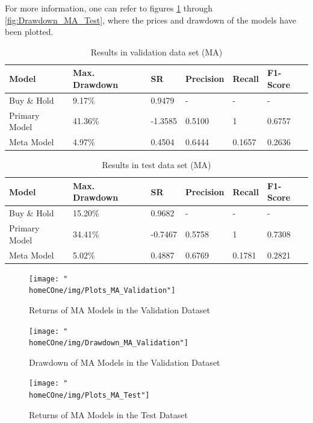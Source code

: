 \documentclass[a4paper]{article}
\newcommand{\homeCOne}{../../Chapter 1 - Metalabeling/Draft}
\begin{document}
For more information, one can refer to figures 
\ref{fig:Plots_MA_Validation} through \ref{fig:Drawdown_MA_Test}, 
where the prices and drawdown of the models have been plotted.

\begin{table}[htbp]
\caption{Results in validation data set (MA)}
\label{tab:ResultsCV}
\centering
\begin{tabular}{ |C{3cm}|C{3cm}|C{2cm}|C{2cm}|C{2cm}|C{2cm}|}
	\hline
	Model 			& Max. Drawdown	& SR			& Precision & Recall 
	& F1-Score\\
	\hline
	Buy \& Hold		&  9.17\% 		&  0.9479	& -		 & - 
	& -\\  
	Primary Model 	& 41.36\% 		& -1.3585	& 0.5100 & 1 
	& 0.6757\\ 
	Meta Model 		&  4.97\% 		&  0.4504	& 0.6444 & 0.1657
	& 0.2636\\ 
	\hline
\end{tabular}
\end{table}

\begin{table}[htbp]
\caption{Results in test data set (MA)}
\label{tab:ResultsTst}
\centering
\begin{tabular}{ |C{3cm}|C{3cm}|C{2cm}|C{2cm}|C{2cm}|C{2cm}|}
	\hline
	Model 			& Max. Drawdown & SR			& Precision & Recall
	& F1-Score\\
	\hline
	Buy \& Hold		& 15.20\% 		&  0.9682	& - 		 & - 
	& -\\ 
	Primary Model 	& 34.41\% 		& -0.7467	& 0.5758 & 1 
	& 0.7308\\ 
	Meta Model 		&  5.02\% 		&  0.4887	& 0.6769 & 0.1781
	& 0.2821\\ 
	\hline
\end{tabular}
\end{table}

\begin{figure}[htbp]
	\centering
	\texttt{[image: "\\homeCOne/img/Plots\_MA\_Validation"]}
	\caption{Returns of MA Models in the Validation Dataset}
	\label{fig:Plots_MA_Validation}
\end{figure}

\begin{figure}[htbp]
	\centering
	\texttt{[image: "\\homeCOne/img/Drawdown\_MA\_Validation"]}
	\caption{Drawdown of MA Models in the Validation Dataset}
	\label{fig:Drawdown_MA_Validation}	
\end{figure}

\begin{figure}[htbp]
	\centering
	\texttt{[image: "\\homeCOne/img/Plots\_MA\_Test"]}
	\caption{Returns of MA Models in the Test Dataset}
	\label{fig:Plots_MA_Test}
\end{figure}
\end{document}
